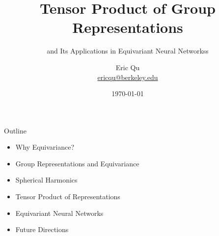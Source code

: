 \documentclass[pdf,serif]{beamer}
\title[Tensor Product of Representations]{Tensor Product of Group Representations}
\subtitle{and Its Applications in Equivariant Neural Networkss}
\begin{document}
\author[Eric Qu, UC Berkeley]{
    \begin{tabular}{c} 
    \Large
    Eric Qu\\
    \footnotesize \href{mailto:ericqu@berkeley.edu}{ericqu@berkeley.edu}
\end{tabular}
\vspace{-3ex}}

\date{\today}

\begin{noheadline}
\begin{frame}\maketitle\end{frame}
\end{noheadline}

\begin{frame}{Outline}
    \begin{itemize}
        \item Why Equivariance?
        \item Group Representations and Equivariance
        \item Spherical Harmonics
        \item Tensor Product of Representations
        \item Equivariant Neural Networks
        \item Future Directions
    \end{itemize}
\end{frame}

\end{document}
